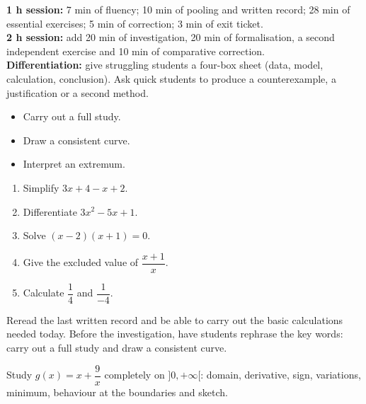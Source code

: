 \ifprof
\begin{methode}
\textbf{1 h session:} 7 min of fluency; 10 min of pooling and written record; 28 min of essential exercises; 5 min of correction; 3 min of exit ticket.\\
\textbf{2 h session:} add 20 min of investigation, 20 min of formalisation, a second independent exercise and 10 min of comparative correction.\\
\textbf{Differentiation:} give struggling students a four-box sheet (data, model, calculation, conclusion). Ask quick students to produce a counterexample, a justification or a second method.
\end{methode}
\fi
{}
\begin{objectifs}\begin{itemize}\item Carry out a full study.\item Draw a consistent curve.\item Interpret an extremum.\end{itemize}\end{objectifs}
\begin{automatismes}\begin{enumerate}\item Simplify $3x+4-x+2$. \item Differentiate $3x^2-5x+1$. \item Solve $(x-2)(x+1)=0$. \item Give the excluded value of $\dfrac{x+1}{x}$. \item Calculate $\dfrac1{4}$ and $\dfrac1{-4}$. \end{enumerate}\end{automatismes}
\begin{prerequis}Reread the last written record and be able to carry out the basic calculations needed today. Before the investigation, have students rephrase the key words: carry out a full study and draw a consistent curve.\end{prerequis}

\begin{activite}
Study $g(x)=x+\dfrac9x$ completely on $]0,+\infty[$: domain, derivative, sign, variations, minimum, behaviour at the boundaries and sketch.
\begin{center}\end{center}
\end{activite}

